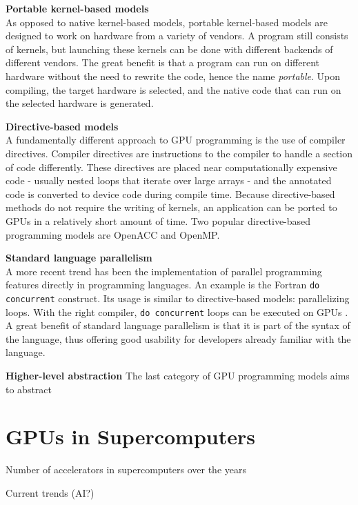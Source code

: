 \textbf{Portable kernel-based models} \\
As opposed to native kernel-based models, portable kernel-based models are designed to work on hardware from a variety of vendors. A program still consists of kernels, but launching these kernels can be done with different backends of different vendors. The great benefit is that a program can run on different hardware without the need to rewrite the code, hence the name \emph{portable}. Upon compiling, the target hardware is selected, and the native code that can run on the selected hardware is generated. 

\textbf{Directive-based models} \\
A fundamentally different approach to GPU programming is the use of compiler directives. Compiler directives are instructions to the compiler to handle a section of code differently. These directives are placed near computationally expensive code - usually nested loops that iterate over large arrays - and the annotated code is converted to device code during compile time. Because directive-based methods do not require the writing of kernels, an application can be ported to GPUs in a relatively short amount of time. Two popular directive-based programming models are OpenACC and OpenMP.

\textbf{Standard language parallelism} \\
A more recent trend has been the implementation of parallel programming features directly in programming languages. An example is the Fortran \texttt{do concurrent} construct. Its usage is similar to directive-based models: parallelizing loops. With the right compiler, \texttt{do concurrent} loops can be executed on GPUs \citep{kedwardStateFortran2022}. A great benefit of standard language parallelism is that it is part of the syntax of the language, thus offering good usability for developers already familiar with the language. 

\textbf{Higher-level abstraction}
The last category of GPU programming models aims to abstract 

\section{GPUs in Supercomputers}

Number of accelerators in supercomputers over the years

Current trends (AI?)

